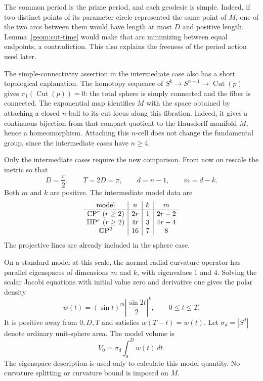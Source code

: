 The common period is the prime period, and each geodesic is simple.
Indeed, if two distinct points of its parameter circle represented the same
point of $M$, one of the two arcs between them would have length
at most $D$ and positive length. Lemma~\ref{geom:cut-time} would
make that arc minimizing between equal endpoints, a contradiction.
This also explains the freeness of the period action used later.

The simple-connectivity assertion in the intermediate case also has
a short topological explanation. The homotopy sequence of
$S^k\to S^{n-1}\to\operatorname{Cut}(p)$ gives
$\pi_1(\operatorname{Cut}(p))=0$: the total sphere is simply connected
and the fiber is connected. The exponential map identifies $M$ with
the space obtained by attaching a closed $n$-ball to its cut locus
along this fibration. Indeed, it gives a continuous bijection from
that compact quotient to the Hausdorff manifold $M$, hence a
homeomorphism. Attaching this $n$-cell does not change the fundamental
group, since the intermediate cases have $n\ge4$.

Only the intermediate cases require the new comparison. From now
on rescale the metric so that
\begin{equation}\label{geom:normalization}
 D=\frac\pi2,\qquad T=2D=\pi,\qquad d=n-1,\qquad m=d-k.
\end{equation}
Both $m$ and $k$ are positive. The intermediate model data are
\[
\begin{array}{c|c|c|c}
\text{model}&n&k&m\\ \hline
\mathbb C\mathrm P^r\ (r\ge2)&2r&1&2r-2\\
\mathbb H\mathrm P^r\ (r\ge2)&4r&3&4r-4\\
\mathbb O\mathrm P^2&16&7&8
\end{array}
\]
The projective lines are already included in the sphere case.

On a standard model at this scale, the normal radial curvature
operator has parallel eigenspaces of dimensions $m$ and $k$, with
eigenvalues $1$ and $4$. Solving the scalar Jacobi equations with
initial value zero and derivative one gives the polar density
\begin{equation}\label{geom:model-density}
 w(t)=(\sin t)^m\left|\frac{\sin2t}{2}\right|^k,
 \qquad 0\le t\le T.
\end{equation}
It is positive away from $0,D,T$ and satisfies $w(T-t)=w(t)$.
Let $\sigma_d=|S^d|$ denote ordinary unit-sphere area. The model
volume is
\begin{equation}\label{geom:model-volume}
 V_0=\sigma_d\int_0^D w(t)\,dt.
\end{equation}
The eigenspace description is used only to calculate this model
quantity. No curvature splitting or curvature bound is imposed
on $M$.

